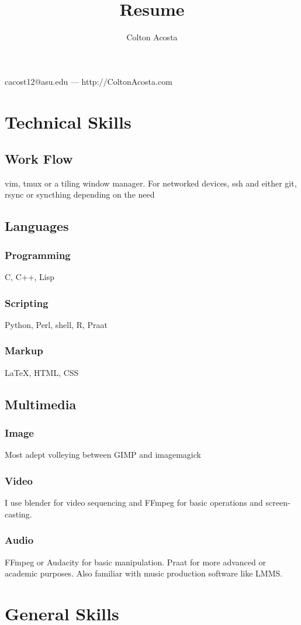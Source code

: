 \documentclass{article}
\makeatletter
\renewcommand{\maketitle}{
\begin{center}
	{\huge\bfseries	
	\theauthor}

\vspace{.25em}

cacost12@asu.edu --- http://ColtonAcosta.com
\end{center}


}
\makeatother
\begin{document}
\title{Resume}
\author{Colton Acosta}
\maketitle
\section{Technical Skills}
\subsection{Work Flow}
vim, tmux or a tiling window manager. For networked devices, ssh and either git, rsync or syncthing depending on the need
\subsection{Languages}
\subsubsection{Programming}
C, C++, Lisp
\subsubsection{Scripting}
Python, Perl, shell, R, Praat
\subsubsection{Markup}
{\LaTeX}, HTML, CSS
\subsection{Multimedia}
\subsubsection{Image}
Most adept volleying between GIMP and imagemagick
\subsubsection{Video}
I use blender for video sequencing and FFmpeg for basic operations and screen-casting.
\subsubsection{Audio}
FFmpeg or Audacity for basic manipulation. Praat for more advanced or academic purposes. Also familiar with music production software like LMMS.
\section{General Skills}
\end{document}

